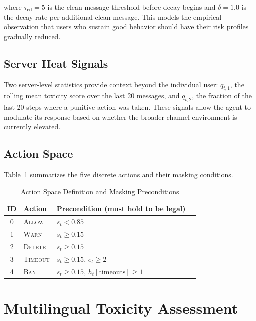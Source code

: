 \documentclass[journal]{IEEEtran}
\begin{document}
where $\tau_{\text{cd}} = 5$ is the clean-message threshold before decay begins and
$\delta = 1.0$ is the decay rate per additional clean message. This models the empirical
observation that users who sustain good behavior should have their risk profiles gradually
reduced.

\subsection{Server Heat Signals}

Two server-level statistics provide context beyond the individual user:
$q_{t,1}$, the rolling mean toxicity score over the last 20 messages, and $q_{t,2}$,
the fraction of the last 20 steps where a punitive action was taken. These signals allow
the agent to modulate its response based on whether the broader channel environment
is currently elevated.

\subsection{Action Space}
Table~\ref{tab:actions} summarizes the five discrete actions and their masking conditions.

\begin{table}[!t]
  \renewcommand{\arraystretch}{1.3}
  \caption{Action Space Definition and Masking Preconditions}
  \label{tab:actions}
  \centering
  \begin{tabular}{clll}
    \toprule
    ID & Action & Precondition (must hold to be legal) \\
    \midrule
    0 & \textsc{Allow}   & $s_t < 0.85$ \\
    1 & \textsc{Warn}    & $s_t \geq 0.15$ \\
    2 & \textsc{Delete}  & $s_t \geq 0.15$ \\
    3 & \textsc{Timeout} & $s_t \geq 0.15$, $e_t \geq 2$ \\
    4 & \textsc{Ban}     & $s_t \geq 0.15$, $h_t[\text{timeouts}] \geq 1$ \\
    \bottomrule
  \end{tabular}
\end{table}


\section{Multilingual Toxicity Assessment}
\label{sec:toxicity}
\end{document}
